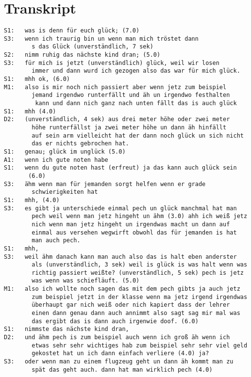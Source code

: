 \section{Transkript}

\begin{lstlisting}[language={}]
S1:   was is denn für euch glück; (7.0)
S3:   wenn ich traurig bin un wenn man mich tröstet dann  
        s das Glück (unverständlich, 7 sek)
S2:   nimm ruhig das nächste kind dran; (5.0)   
S3:   für mich is jetzt (unverständlich) glück, weil wir losen
        immer und dann wurd ich gezogen also das war für mich glück. 
S1:   mhh ok, (6.0)
M1:   also is mir noch nich passiert aber wenn jetz zum beispiel 
        jemand irgendwo runterfällt und äh un irgendwo festhalten
         kann und dann nich ganz nach unten fällt das is auch glück
S1:   mhh (4.0)
D2:   (unverständlich, 4 sek) aus drei meter höhe oder zwei meter 
        höhe runterfällst ja zwei meter höhe un dann äh hinfällt
        auf sein arm vielleicht hat der dann noch glück un sich nicht
        das er nichts gebrochen hat.
S1:   genau; glück im unglück (5.0)
A1:   wenn ich gute noten habe
S1:   wenn du gute noten hast (erfreut) ja das kann auch glück sein 
       (6.0)
S3:   ähm wenn man für jemanden sorgt helfen wenn er grade 
        schwierigkeiten hat
S1:   mhh, (4.0)
S3:   es gibt ja unterschiede einmal pech un glück manchmal hat man 
        pech weil wenn man jetz hingeht un ähm (3.0) ahh ich weiß jetz 
        nich wenn man jetz hingeht un irgendwas macht un dann auf 
        einmal aus versehen wegwirft obwohl das für jemanden is hat 
        man auch pech.
S1:   mhh,
S3:   weil ähm danach kann man auch also das is halt eben anderster 
        als (unverständlich, 3 sek) weil is glück is was halt wenn was 
        richtig passiert weißte? (unverständlich, 5 sek) pech is jetz 
        was wenn was schiefläuft. (5.0)
M1:   also ich wollte noch sagen das mit dem pech gibts ja auch jetz 
        zum beispiel jetzt in der klasse wenn ma jetz irgend irgendwas 
        überhaupt gar nich weiß oder nich kapiert dass der lehrer 
        einen dann genau dann auch annimmt also sagt sag mir mal was 
        das ergibt das is dann auch irgenwie doof. (6.0)
S1:   nimmste das nächste kind dran,
D2:   und ähm pech is zum beispiel auch wenn ich groß äh wenn ich   
        etwas sehr sehr wichtiges hab zum beispiel sehr sehr viel geld 
        gekostet hat un ich dann einfach verliere (4.0) ja? 
S3:   oder wenn man zu einem flugzeug geht un dann äh kommt man zu 
        spät das geht auch. dann hat man wirklich pech (4.0)

\end{lstlisting}
